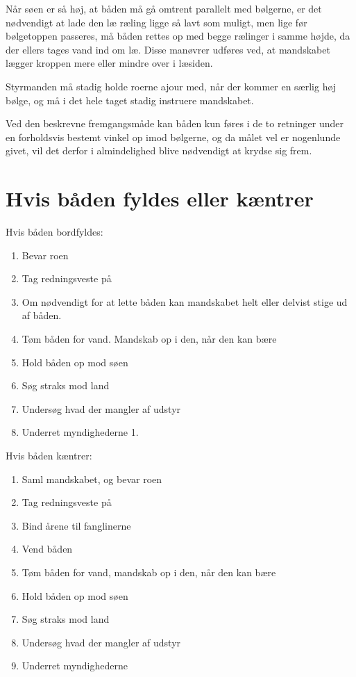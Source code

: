 \documentclass{article}
\begin{document}
Når søen er så høj, at båden må gå omtrent parallelt med bølgerne, er det
nødvendigt at lade den læ ræling ligge så lavt som muligt, men lige før
bølgetoppen passeres, må båden rettes op med begge rælinger i samme
højde, da der ellers tages vand ind om læ. Disse manøvrer udføres ved, at
mandskabet lægger kroppen mere eller mindre over i læsiden.

Styrmanden må stadig holde roerne ajour med, når der kommer en særlig høj
bølge, og må i det hele taget stadig instruere mandskabet.

Ved den beskrevne fremgangsmåde kan båden kun føres i de to retninger
under en forholdsvis bestemt vinkel op imod bølgerne, og da målet vel er
nogenlunde givet, vil det derfor i almindelighed blive nødvendigt at
krydse sig frem.

\section{Hvis båden fyldes eller kæntrer}

Hvis båden bordfyldes:

\begin{enumerate}
\item Bevar roen
\item Tag redningsveste på
\item Om nødvendigt for at lette båden kan mandskabet helt eller delvist stige ud af båden.
\item Tøm båden for vand. Mandskab op i den, når den kan bære
\item Hold båden op mod søen
\item Søg straks mod land
\item Undersøg hvad der mangler af udstyr
\item Underret myndighederne 1.
\end{enumerate}

Hvis båden kæntrer:

\begin{enumerate}
    \item Saml mandskabet, og bevar roen
    \item Tag redningsveste på
    \item Bind årene til fanglinerne
    \item Vend båden
    \item Tøm båden for vand, mandskab op i den, når den kan bære
    \item Hold båden op mod søen
    \item Søg straks mod land
    \item Undersøg hvad der mangler af udstyr
    \item Underret myndighederne
\end{enumerate}
\end{document}
